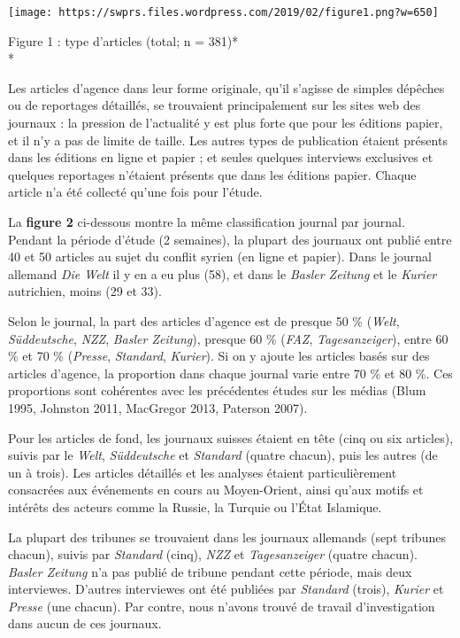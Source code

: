 \texttt{[image: https://swprs.files.wordpress.com/2019/02/figure1.png?w=650]}

Figure 1 : type d'articles (total; n = 381)*\\
*

Les articles d'agence dans leur forme originale, qu'il s'agisse de
simples dépêches ou de reportages détaillés, se trouvaient
principalement sur les sites web des journaux : la pression de
l'actualité y est plus forte que pour les éditions papier, et il n'y a
pas de limite de taille. Les autres types de publication étaient
présents dans les éditions en ligne et papier ; et seules quelques
interviews exclusives et quelques reportages n'étaient présents que dans
les éditions papier. Chaque article n'a été collecté qu'une fois pour
l'étude.

La \textbf{figure 2} ci-dessous montre la même classification journal
par journal. Pendant la période d'étude (2 semaines), la plupart des
journaux ont publié entre 40 et 50 articles au sujet du conflit syrien
(en ligne et papier). Dans le journal allemand \emph{Die Welt} il y en a
eu plus (58), et dans le \emph{Basler Zeitung} et le \emph{Kurier}
autrichien, moins (29 et 33).

Selon le journal, la part des articles d'agence est de presque 50 \%
(\emph{Welt}, \emph{Süddeutsche}, \emph{NZZ}, \emph{Basler Zeitung}),
presque 60 \% (\emph{FAZ}, \emph{Tagesanzeiger}), entre 60 \% et 70 \%
(\emph{Presse}, \emph{Standard}, \emph{Kurier}). Si on y ajoute les
articles basés sur des articles d'agence, la proportion dans chaque
journal varie entre 70 \% et 80 \%. Ces proportions sont cohérentes avec
les précédentes études sur les médias (Blum 1995, Johnston 2011,
MacGregor 2013, Paterson 2007).

Pour les articles de fond, les journaux suisses étaient en tête (cinq ou
six articles), suivis par le \emph{Welt}, \emph{Süddeutsche} et
\emph{Standard} (quatre chacun), puis les autres (de un à trois). Les
articles détaillés et les analyses étaient particulièrement consacrées
aux événements en cours au Moyen-Orient, ainsi qu'aux motifs et intérêts
des acteurs comme la Russie, la Turquie ou l'État Islamique.

La plupart des tribunes se trouvaient dans les journaux allemands (sept
tribunes chacun), suivis par \emph{Standard} (cinq), \emph{NZZ} et
\emph{Tagesanzeiger} (quatre chacun). \emph{Basler Zeitung} n'a pas
publié de tribune pendant cette période, mais deux interviewes. D'autres
interviewes ont été publiées par \emph{Standard} (trois), \emph{Kurier}
et \emph{Presse} (une chacun). Par contre, nous n'avons trouvé de
travail d'investigation dans aucun de ces journaux.

